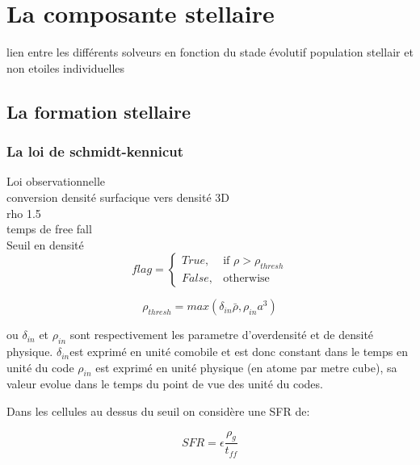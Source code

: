 \chapter{La composante stellaire}

lien entre les différents solveurs en fonction du stade évolutif
population stellair et non etoiles individuelles\\

\section{La formation stellaire}

\subsection{La loi de schmidt-kennicut}
Loi observationnelle \\
conversion densité surfacique vers densité 3D\\
rho 1.5\\
temps de free fall\\

Seuil en densité \\
\begin{equation}
	flag = 
  \begin{cases}
      True, & \text{if } \rho > \rho_{thresh}\\
      False,              & \text{otherwise}
  \end{cases}
\end{equation} 




\begin{equation}
	\rho_{thresh} = max\left(  \delta_{in} \bar{\rho}, \rho_{in} a^3 \right)
\end{equation} 

ou $\delta_{in}$ et $\rho_{in}$  sont respectivement les parametre d'overdensité et de densité physique.
$\delta_{in}$est exprimé en unité comobile et est donc constant dans le temps en unité du code
 $\rho_{in}$ est exprimé en unité physique (en atome par metre cube), sa valeur evolue dans le temps du point de vue des unité du codes.
 
Dans les cellules au dessus du seuil on considère une SFR de:

\begin{equation}
	SFR = \epsilon \frac{\rho_g}{t_{ff}}
    \label{eq_sfr}
\end{equation}


